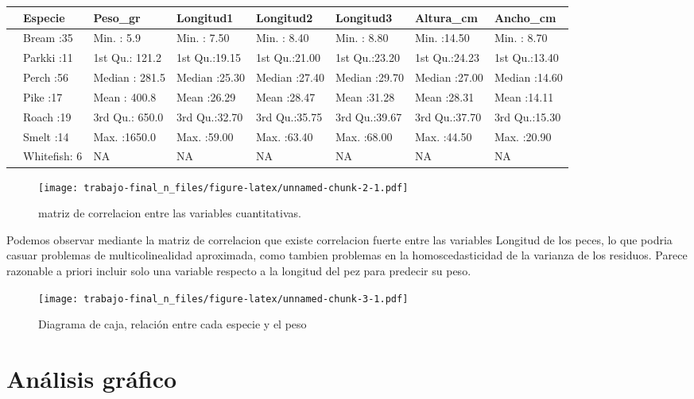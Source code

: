 \documentclass[
]{article}
\begin{document}
\begingroup\fontsize{8}{10}\selectfont

\begin{longtable}[t]{llllllll}
\toprule
 & Especie & Peso\_gr & Longitud1 & Longitud2 & Longitud3 & Altura\_cm & Ancho\_cm\\
\midrule
 & Bream    :35 & Min.   :   5.9 & Min.   : 7.50 & Min.   : 8.40 & Min.   : 8.80 & Min.   :14.50 & Min.   : 8.70\\
 & Parkki   :11 & 1st Qu.: 121.2 & 1st Qu.:19.15 & 1st Qu.:21.00 & 1st Qu.:23.20 & 1st Qu.:24.23 & 1st Qu.:13.40\\
 & Perch    :56 & Median : 281.5 & Median :25.30 & Median :27.40 & Median :29.70 & Median :27.00 & Median :14.60\\
 & Pike     :17 & Mean   : 400.8 & Mean   :26.29 & Mean   :28.47 & Mean   :31.28 & Mean   :28.31 & Mean   :14.11\\
 & Roach    :19 & 3rd Qu.: 650.0 & 3rd Qu.:32.70 & 3rd Qu.:35.75 & 3rd Qu.:39.67 & 3rd Qu.:37.70 & 3rd Qu.:15.30\\
\addlinespace
 & Smelt    :14 & Max.   :1650.0 & Max.   :59.00 & Max.   :63.40 & Max.   :68.00 & Max.   :44.50 & Max.   :20.90\\
 & Whitefish: 6 & NA & NA & NA & NA & NA & NA\\
\bottomrule
\end{longtable}
\endgroup{}

\begin{figure}
\centering
\texttt{[image: trabajo-final\_n\_files/figure-latex/unnamed-chunk-2-1.pdf]}
\caption{matriz de correlacion entre las variables cuantitativas.}
\end{figure}

Podemos observar mediante la matriz de correlacion que existe
correlacion fuerte entre las variables Longitud de los peces, lo que
podria casuar problemas de multicolinealidad aproximada, como tambien
problemas en la homoscedasticidad de la varianza de los residuos. Parece
razonable a priori incluir solo una variable respecto a la longitud del
pez para predecir su peso.

\begin{figure}
\centering
\texttt{[image: trabajo-final\_n\_files/figure-latex/unnamed-chunk-3-1.pdf]}
\caption{Diagrama de caja, relación entre cada especie y el peso}
\end{figure}

\section{Análisis gráfico}\label{anuxe1lisis-gruxe1fico}
\end{document}
